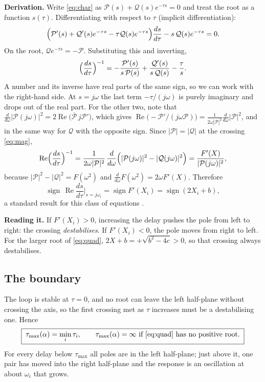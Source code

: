 \documentclass[11pt,a4paper]{article}
\theoremstyle{definition}
\begin{document}
\textbf{Derivation.} Write \eqref{eq:char} as
$\mathcal{P}(s) + \mathcal{Q}(s)e^{-\tau s} = 0$ and treat the root as a
function $s(\tau)$. Differentiating with respect to $\tau$ (implicit
differentiation):
\[
\Bigl(\mathcal{P}'(s) + \mathcal{Q}'(s)e^{-\tau s} - \tau\mathcal{Q}(s)e^{-\tau s}\Bigr)\frac{ds}{d\tau}
- s\,\mathcal{Q}(s)e^{-\tau s} = 0 .
\]
On the root, $\mathcal{Q}e^{-\tau s} = -\mathcal{P}$. Substituting this
and inverting,
\[
\Bigl(\frac{ds}{d\tau}\Bigr)^{-1}
= -\frac{\mathcal{P}'(s)}{s\,\mathcal{P}(s)} + \frac{\mathcal{Q}'(s)}{s\,\mathcal{Q}(s)} - \frac{\tau}{s}.
\]
A number and its inverse have real parts of the same sign, so we can
work with the right-hand side. At $s = j\omega$ the last term
$-\tau/(j\omega)$ is purely imaginary and drops out of the real part.
For the other two, note that
$\frac{d}{d\omega}|\mathcal{P}(j\omega)|^2 = 2\operatorname{Re}\bigl(\overline{\mathcal{P}}\, j\mathcal{P}'\bigr)$,
which gives
$\operatorname{Re}\bigl(-\mathcal{P}'/(j\omega\mathcal{P})\bigr)
= \frac{1}{2\omega|\mathcal{P}|^2}\frac{d}{d\omega}|\mathcal{P}|^2$,
and in the same way for $\mathcal{Q}$ with the opposite sign. Since
$|\mathcal{P}| = |\mathcal{Q}|$ at the crossing \eqref{eq:mag},
\[
\operatorname{Re}\Bigl(\frac{ds}{d\tau}\Bigr)^{-1}
= \frac{1}{2\omega|\mathcal{P}|^2}\,\frac{d}{d\omega}\Bigl(|\mathcal{P}(j\omega)|^2 - |\mathcal{Q}(j\omega)|^2\Bigr)
= \frac{F'(X)}{|\mathcal{P}(j\omega)|^2},
\]
because $|\mathcal{P}|^2 - |\mathcal{Q}|^2 = F(\omega^2)$ and
$\frac{d}{d\omega}F(\omega^2) = 2\omega F'(X)$. Therefore
\begin{equation}
\operatorname{sign}\,\operatorname{Re}\frac{ds}{d\tau}\bigg|_{s=j\omega_i}
= \operatorname{sign} F'(X_i) = \operatorname{sign}(2X_i + b),
\label{eq:direction}
\end{equation}
a standard result for this class of equations
\cite{cooke1986zeroes,gu2003delay}.

\textbf{Reading it.} If $F'(X_i) > 0$, increasing the delay pushes the
pole from left to right: the crossing \emph{destabilises}. If
$F'(X_i) < 0$, the pole moves from right to left. For the larger root of
\eqref{eq:quad}, $2X + b = +\sqrt{b^2 - 4c} > 0$, so that crossing
always destabilises.

\subsection{The boundary}
The loop is stable at $\tau = 0$, and no root can leave the left
half-plane without crossing the axis, so the first crossing met as
$\tau$ increases must be a destabilising one. Hence
\begin{equation}
\boxed{\;\tau_{\max}(\alpha) = \min_i \tau_i,\qquad
\tau_{\max}(\alpha) = \infty \text{ if \eqref{eq:quad} has no positive root.}\;}
\label{eq:taumax}
\end{equation}
For every delay below $\tau_{\max}$ all poles are in the left
half-plane; just above it, one pair has moved into the right half-plane
and the response is an oscillation at about $\omega_i$ that grows.
\end{document}
